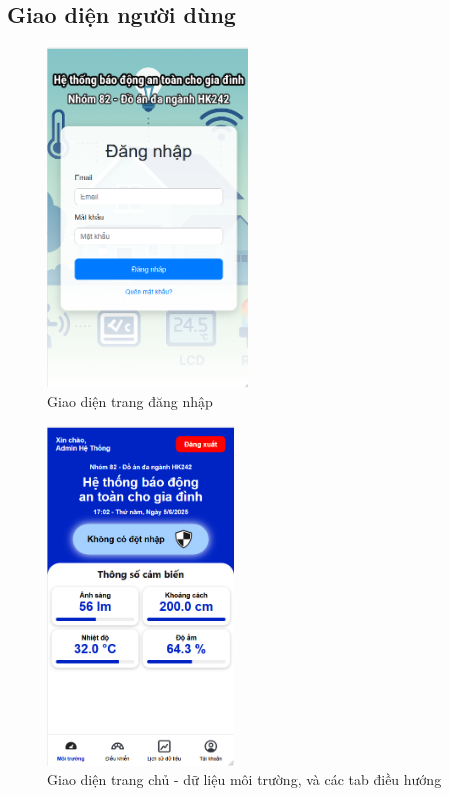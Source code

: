 \subsection{Giao diện người dùng}


\begin{minipage}{0.45\textwidth}
    \begin{figure}[H]
        \centering
        \includegraphics[height=9cm]{figures/dangnhap.png}
        \caption{Giao diện trang đăng nhập}
        \label{fig:dangnhap}
    \end{figure}
\end{minipage}
\hfill
\begin{minipage}{0.45\textwidth}
    \begin{center}
        \begin{figure}[H]
            \centering
            \includegraphics[height=9cm]{figures/moitruong.png}
            \caption{Giao diện trang chủ - dữ liệu môi trường, và các tab điều hướng}
            \label{fig:moitruong}
        \end{figure}
    \end{center}
\end{minipage}



